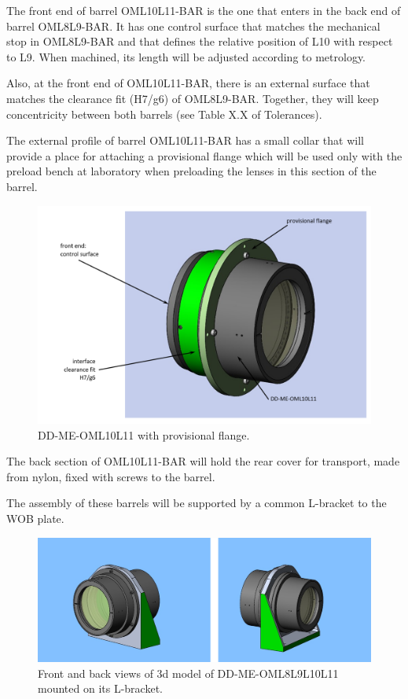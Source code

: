\documentclass{report}
\begin{document}
The front end of barrel OML10L11-BAR is the one that enters in the back end of barrel OML8L9-BAR. It has one control surface that matches the mechanical stop in OML8L9-BAR and that defines the relative position of L10 with respect to L9. When machined, its length will be adjusted according to metrology.

Also, at the front end of OML10L11-BAR, there is an external surface that matches the clearance fit (H7/g6) of OML8L9-BAR. Together, they will keep concentricity between both barrels (see Table X.X of Tolerances).

The external profile of barrel OML10L11-BAR has a small collar that will provide a place for attaching a provisional flange which will be used only with the preload bench at laboratory when preloading the lenses in this section of the barrel. 

\begin{figure}
\begin{center}
\includegraphics[width=0.9\linewidth]{figures/DD-ME-OML10L11-PF.png}
\end{center}
\caption{DD-ME-OML10L11 with provisional flange.}
\label{figure:WOB-L10L11-PF}
\end{figure}

The back section of OML10L11-BAR will hold the rear cover for transport, made from nylon, fixed with screws to the barrel.

The assembly of these barrels will be supported by a common L-bracket to the WOB plate.

\begin{figure}
\begin{center}
\includegraphics[width=0.9\linewidth]{figures/DD-OML8-L11_wLBr_PPs.png}
\end{center}
\caption{Front and back views of 3d model of DD-ME-OML8L9L10L11 mounted on its L-bracket.}
\label{figure:WOB-L10L11-LBr}
\end{figure}
\end{document}
